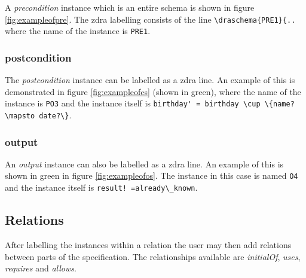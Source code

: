A \emph{precondition} instance which is an entire schema is shown in figure
\ref{fig:exampleofpre}. The \gls{zdra} labelling consists of the line
\verb|\draschema{PRE1}{..| where the name of the instance is \verb|PRE1|.


\subsubsection{postcondition}

The \emph{postcondition} instance can be labelled as a \gls{zdra} line. An
example of this is demonstrated in figure \ref{fig:exampleofcs} (shown in
green), where the name of the instance is \verb|PO3| and the instance itself is
\verb|birthday' = birthday \cup \{name? \mapsto date?\}|.

\subsubsection{output}

An \emph{output} instance can also be labelled as a \gls{zdra} line. An example
of this is shown in green in figure \ref{fig:exampleofos}. The instance in this
case is named
 \verb|O4| and the instance itself is \verb|result! =already\_known|.

\subsection{Relations}
\label{subsec:zdrarelations}

After labelling the instances within a relation the user may then add relations
between parts of the specification. The relationships available are
\emph{initialOf}, \emph{uses}, \emph{requires} and \emph{allows}.

